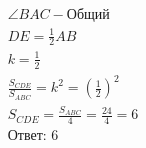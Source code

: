 \begin{tcolorbox}[
    colback=white!100!white,
    colframe=green!75!black,
    title=Решение 1.1
  ]
  \begin{equation*}
    \begin{array}{l}
      \angle BAC - \text{Общий}                                  \\
      DE = \frac{1}{2} AB                                        \\
      k = \frac{1}{2}                                            \\
      \frac{S_{CDE}}{S_{ABC}} = k^2 = \left(\frac{1}{2}\right)^2 \\
      S_{CDE} = \frac{S_{ABC}}{4} = \frac{24}{4} = 6             \\
      \text{Ответ: } 6                                           \\
    \end{array}
  \end{equation*}

\end{tcolorbox}

